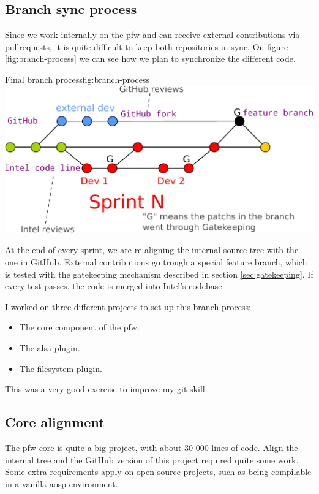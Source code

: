 \subsection{Branch sync process}\label{sec:syncProcess}
Since we work internally on the \gls{pfw} and can receive external contributions via \gls{pullrequests},
it is quite difficult to keep both repositories in sync.
On figure \ref{fig:branch-process} we can see how we plan to synchronize the different code.

\begin{figureGraphics}{Final branch process}{fig:branch-process}
    \includegraphics[width=\textwidth]{./src/img/branches-process-crop.pdf}
\end{figureGraphics}
At the end of every sprint, we are re-aligning the internal source tree with the one in \gls{GitHub}.
External contributions go trough a special feature branch, which is tested with the gatekeeping mechanism described in section \ref{sec:gatekeeping}.
If every test passes, the code is merged into Intel's codebase.

I worked on three different projects to set up this branch process:
\begin{itemize}
    \item The core component of the \gls{pfw}.
    \item The \gls{alsa} plugin.
    \item The filesystem plugin.
\end{itemize}

This was a very good exercise to improve my \gls{git} skill.

\subsection{Core alignment}
The \gls{pfw} core is quite a big project, with about 30 000 lines of code.
Align the internal tree and the \gls{GitHub} version of this project required quite some work.
Some extra requirements apply on open-source projects, such as being compilable in a vanilla \gls{aosp} environment.

